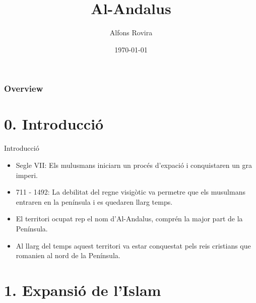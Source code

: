 \documentclass{beamer}
\title[Short title]{Al-Andalus} %
\author{Alfons Rovira} %
\institute[Llagostí] %
{
https://llagosti.wordpress.com \\ %
\medskip
}
\date{\today} %
\begin{document}
\begin{frame}
\titlepage %
\end{frame}


\begin{frame}
\frametitle{Overview} %
\tableofcontents %
\end{frame}



\section{0. Introducció}

\begin{frame}{Introducció}
  
\begin{itemize}[<+-| alert@+>]
        \item Segle VII: Els mulusmans iniciarn un procés d'expació i conquistaren un gra imperi.
        \item 711 - 1492: La debilitat del regne visigòtic va permetre que els musulmans entraren en la península i es quedaren llarg temps.
        \item El territori ocupat rep el nom d'Al-Andalus, comprén la major part de la Península.
        \item Al llarg del temps aquest territori va estar conquestat pels reis cristians que romanien al nord de la Península.
\end{itemize}

\end{frame}

\section{1. Expansió de l'Islam}
\end{document}
